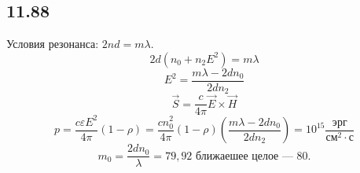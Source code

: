 \subsection*{11.88}
Условия резонанса: $2 n d = m \lambda$.
$$2d (n_0 + n_2 E^2) = m \lambda$$
$$E^2 = \frac{m\lambda - 2 d n_0}{2dn_2}$$
$$\vec{S} = \frac{c}{4\pi} \vec{E} \times \vec{H}$$
$$p = \frac{c \varepsilon E^2}{4 \pi} (1 - \rho) = \frac{c n_0^2}{4\pi} (1-\rho) (\frac{m\lambda - 2dn_0}{2dn_2}) = 10^{15} \frac{эрг}{см^2 \cdot с}$$
$$m_0 = \frac{2dn_0}{\lambda} = 79,92 \text{ ближаешее целое --- 80.}$$
